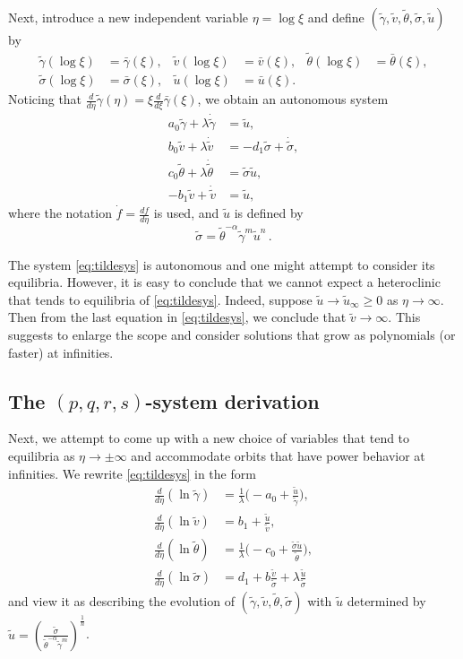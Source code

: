 \documentclass[11pt]{article}
\def\bg{{\bar{\gamma}}}
\def\bv{{\bar{v}}}
\def\bth{{\bar{\theta}}}
\def\bs{{\bar{\sigma}}}
\def\bu{{\bar{u}}}
\def\tg{{\tilde{\gamma}}}
\def\tv{{\tilde{v}}}
\def\tth{{\tilde{\theta}}}
\def\ts{{\tilde{\sigma}}}
\def\tu{{\tilde{u}}}
\def\dtg{{\dot{\tilde{\gamma}}}}
\def\dtv{{\dot{\tilde{v}}}}
\def\dtth{{\dot{\tilde{\theta}}}}
\def\dts{{\dot{\tilde{\sigma}}}}
\theoremstyle{remark}
\begin{document}
Next, introduce a new independent variable $\eta = \log\xi$ and define $(\tg,\tv,\tth,\ts,\tu)$ by
\begin{equation} \label{eq:BARtoTIL}
\begin{aligned}
 \tg(\log\xi)&=\bg(\xi), &
 \tv(\log\xi)&=\bv(\xi), &
 \tth(\log\xi)&=\bth(\xi), \\
 \ts(\log\xi)&=\bs(\xi), &
 \tu(\log\xi)&=\bu(\xi).
\end{aligned}
\end{equation}
Noticing that $\frac{d}{d\eta}\tg(\eta) = \xi \frac{d}{d\xi}\bg(\xi)$, we obtain an autonomous system
\begin{equation} \label{eq:tildesys}
 \begin{aligned}
  a_0\tg + \lambda\dtg &=\tu,\\
  b_0\tv + \lambda\dtv &=-d_1 \ts + \dts,\\
  c_0\tth+ \lambda\dtth &= \ts\tu, \\
  -b_1\tv+\dtv &= \tu,
 \end{aligned}
\end{equation}
where the notation $\dot{f}=\frac{df}{d\eta}$ is used, and $\tu$ is defined by
$$
\ts =\tth^{-\alpha}\tg^m\tu^n \, .
$$


The system \eqref{eq:tildesys} is autonomous and one might attempt to consider its equilibria.
However, it is easy to conclude that we cannot expect a heteroclinic that  tends to equilibria of \eqref{eq:tildesys}.
Indeed, suppose $\tu \rightarrow \tu_\infty\ge 0$ as $\eta \rightarrow \infty$.
Then from the last equation in \eqref{eq:tildesys},
we conclude that $\tv \rightarrow \infty$. %
This suggests to enlarge the scope and consider solutions that grow as polynomials (or faster) at infinities.




\subsection{The $(p,q,r,s)$-system derivation}
Next, we attempt to come up with a new choice of variables that tend to equilibria as $\eta \rightarrow \pm \infty$ and accommodate
orbits that have power behavior at infinities. We rewrite \eqref{eq:tildesys} in the form
\begin{equation}
 \label{eq:tildesys2}
\begin{aligned}
\frac{d}{d\eta}{(\ln{\tg})}  &=  \tfrac{1}{\lambda} \big (- a_0 +  \frac{\tu}{\tg} \big ),
\\
 \frac{d}{d\eta}{(\ln{\tv})}  &=   b_1 + \frac{\tu}{\tv} ,
\\
\frac{d}{d\eta}{(\ln{\tth})} &=   \tfrac{1}{\lambda} \big (- c_0 +  \frac{\ts \tu}{\tth} \big ),
\\
\frac{d}{d\eta}{( \ln{\ts}  )} &= d_1 + b \frac{\tv}{\ts} +   \lambda \frac{\tu}{\ts}
\end{aligned}
\end{equation}
and view it as describing the evolution of $(\tg,\tv,\tth,\ts)$ with $\tu$ determined by $\tu = \left ( \frac{\ts}{ \tth^{-\alpha} \tg^m} \right )^\frac{1}{n}$.
\end{document}
